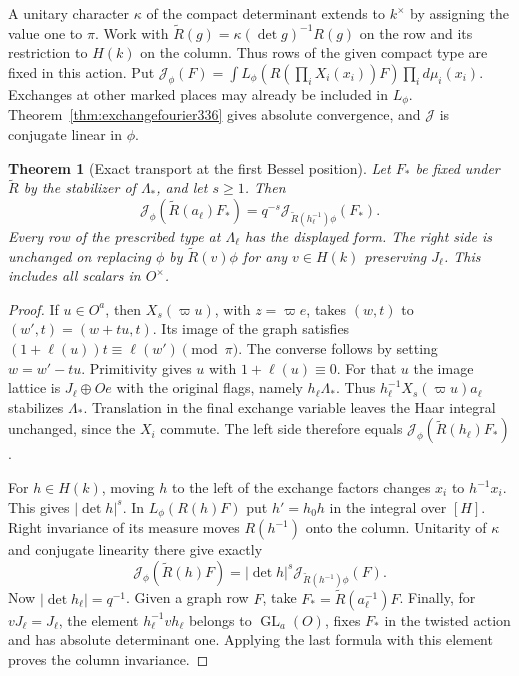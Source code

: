 \documentclass[a4paper,11pt]{article}
\newtheorem{theorem}[proposition]{Theorem}
\theoremstyle{definition}
\theoremstyle{remark}
\numberwithin{equation}{section}
\newcommand{\GL}{\operatorname{GL}}
\begin{document}
A unitary character \(\kappa\) of the compact determinant extends
to \(k^\times\) by assigning the value one to \(\pi\). Work with
\(\widetilde R(g)=\kappa(\det g)^{-1}R(g)\) on the row and its
restriction to \(H(k)\) on the column. Thus rows of the given
compact type are fixed in this action. Put
\(\mathcal J_\phi(F)=\int L_\phi(R(\prod_i X_i(x_i))F)\prod_i
d\mu_i(x_i)\). Exchanges at other marked places may already be
included in \(L_\phi\). Theorem~\ref{thm:exchangefourier336} gives
absolute convergence, and \(\mathcal J\) is conjugate linear in \(\phi\).
\begin{theorem}[Exact transport at the first Bessel position]\label{thm:graphtransport337}
Let \(F_*\) be fixed under \(\widetilde R\) by the stabilizer of
\(\Lambda_*\), and let \(s\ge1\). Then
\[
 \mathcal J_\phi(\widetilde R(a_\ell)F_*) =
        q^{-s}\mathcal J_{\widetilde R(h_\ell^{-1})\phi}(F_*).
\]
Every row of the prescribed type at \(\Lambda_\ell\) has the
displayed form. The right side is unchanged on replacing \(\phi\)
by \(\widetilde R(v)\phi\) for any \(v\in H(k)\) preserving
\(J_\ell\). This includes all scalars in \(O^\times\).
\end{theorem}
\begin{proof}
If \(u\in O^a\), then \(X_s(\varpi u)\), with \(z=\varpi e\),
takes \((w,t)\) to \((w',t)=(w+tu,t)\). Its image of the graph
satisfies \((1+\ell(u))t\equiv\ell(w')\pmod\pi\).
The converse follows by setting \(w=w'-tu\). Primitivity gives
\(u\) with \(1+\ell(u)\equiv0\). For that \(u\) the image lattice
is \(J_\ell\oplus Oe\) with the original flags, namely
\(h_\ell\Lambda_*\). Thus
\(h_\ell^{-1}X_s(\varpi u)a_\ell\) stabilizes \(\Lambda_*\).
Translation in the final exchange variable leaves the Haar integral
unchanged, since the \(X_i\) commute. The left side therefore equals
\(\mathcal J_\phi(\widetilde R(h_\ell)F_*)\).

For \(h\in H(k)\), moving \(h\) to the left of the exchange factors
changes \(x_i\) to \(h^{-1}x_i\). This gives \(|\det h|^s\).
In \(L_\phi(R(h)F)\) put \(h'=h_0h\) in the integral over \([H]\).
Right invariance of its measure moves \(R(h^{-1})\) onto the column.
Unitarity of \(\kappa\) and conjugate linearity there give exactly
\[
 \mathcal J_\phi(\widetilde R(h)F)=
 |\det h|^s\mathcal J_{\widetilde R(h^{-1})\phi}(F).
\]
Now \(|\det h_\ell|=q^{-1}\). Given a graph row \(F\), take
\(F_*=\widetilde R(a_\ell^{-1})F\). Finally, for \(vJ_\ell=J_\ell\),
the element \(h_\ell^{-1}vh_\ell\) belongs to \(\GL_a(O)\), fixes
\(F_*\) in the twisted action and has absolute determinant one.
Applying the last formula with this element proves the column
invariance.
\end{proof}
\end{document}
